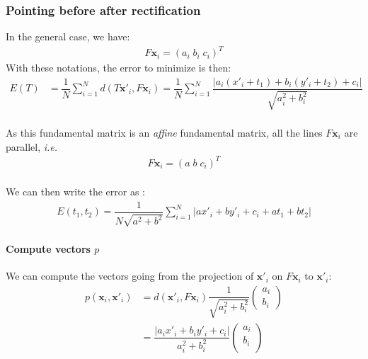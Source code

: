 \documentclass[paper=a4, fontsize=11pt]{article}
\begin{document}
\subsubsection{Pointing before after rectification}
In the general case, we have:
\begin{align*}
F\textbf{x}_i = \left( a_i \; b_i \; c_i \right)^T
\end{align*}
With these notations, the error to minimize is then:
\begin{align*}
E(T) &= \dfrac{1}{N} \sum\limits_{i=1}^{N} d(T\textbf{x}'_i, F\textbf{x}_i) = \dfrac{1}{N} \sum\limits_{i=1}^{N} \dfrac{|a_i(x'_i + t_1) + b_i(y'_i +t_2)+ c_i|}{\sqrt{a_i^2 + b_i^2}}
\end{align*}\\
As this fundamental matrix is an \textit{affine} fundamental matrix, all the lines $F\textbf{x}_i$ are parallel, \textit{i.e.} 
\begin{align*}
F\textbf{x}_i = \left( a\; b\; c_i \right)^T
\end{align*}\\
We can then write the error as :
\begin{align*}
E(t_1, t_2) = \dfrac{1}{N\sqrt{a^2 + b^2}} \sum\limits_{i=1}^{N} |ax'_i+ by'_i + c_i + at_1 + bt_2|
\end{align*}
\paragraph{Compute vectors $p$\\}
We can compute the vectors going from the projection of $\textbf{x}'_i$ on $F\textbf{x}_i$ to $\textbf{x}'_i$:
\begin{align*}
p(\textbf{x}_i, \textbf{x}'_i) &= d(\textbf{x}'_i, F\textbf{x}_i)\dfrac{1}{\sqrt{a_i^2 + b_i^2}}
\begin{pmatrix} 
a_i \\
b_i 
\end{pmatrix}  \\
&=
\dfrac{|a_ix'_i + b_iy'_i + c_i|}{a_i^2 + b_i^2}
\begin{pmatrix} 
a_i \\
b_i \\
\end{pmatrix}
\end{align*}
\end{document}
